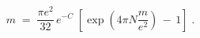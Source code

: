 \begin{equation}\label{eq:mr3}
m \;=\; \frac{\pi e^2 }{32} \, e^{-C} \; 
\left[ \exp (4 \pi N \frac{m}{e^2}) \,-\, 1 \right]\;.
\end{equation}

